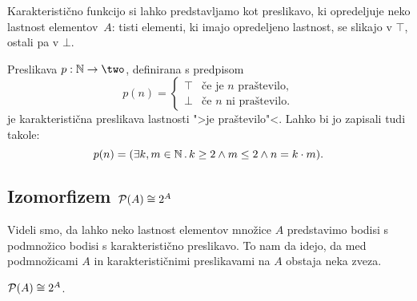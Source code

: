 Karakteristično funkcijo si lahko predstavljamo kot preslikavo, ki opredeljuje
neko lastnost elementov~$A$: tisti elementi, ki imajo opredeljeno lastnost, se
slikajo v $\top$, ostali pa v $\bot$.

\begin{primer}
  Preslikava $p : \NN \to \two$, definirana s predpisom
  \begin{equation*}
    p(n) = 
    \begin{cases}
      \top & \text{če je $n$ praštevilo}, \\
      \bot & \text{če $n$ ni praštevilo}.
    \end{cases}
  \end{equation*}
  je karakteristična preslikava lastnosti ">je praštevilo"<. Lahko bi jo zapisali tudi takole:
  \begin{equation*}
    p(n) = (\exists k, m \in \mathbb{N} \,.\, k \geq 2 \land m \leq 2 \land n = k \cdot m).
  \end{equation*}
\end{primer}


\subsection{Izomorfizem $\mathcal{P}(A) \cong 2^A$}

Videli smo, da lahko neko lastnost elementov množice $A$ predstavimo bodisi s
podmnožico bodisi s karakteristično preslikavo. To nam da idejo, da med
podmnožicami $A$ in karakterističnimi preslikavami na $A$ obstaja neka zveza.

\begin{izrek}
  $\mathcal{P}(A) \cong 2^A$.
\end{izrek}

